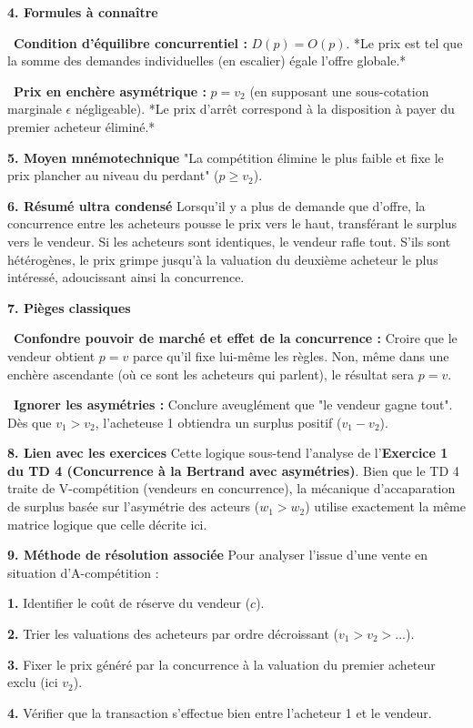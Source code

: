 \documentclass[11pt, a4paper]{report}
\begin{document}
\textbf{4. Formules à connaître}
\par \textbullet\ \textbf{Condition d'équilibre concurrentiel :} $D(p) = O(p)$. *Le prix est tel que la somme des demandes individuelles (en escalier) égale l'offre globale.*
\par \textbullet\ \textbf{Prix en enchère asymétrique :} $p = v_2$ (en supposant une sous-cotation marginale $\epsilon$ négligeable). *Le prix d'arrêt correspond à la disposition à payer du premier acheteur éliminé.*

\textbf{5. Moyen mnémotechnique}
"La compétition élimine le plus faible et fixe le prix plancher au niveau du perdant" ($p \ge v_2$).

\textbf{6. Résumé ultra condensé}
Lorsqu'il y a plus de demande que d'offre, la concurrence entre les acheteurs pousse le prix vers le haut, transférant le surplus vers le vendeur. Si les acheteurs sont identiques, le vendeur rafle tout. S'ils sont hétérogènes, le prix grimpe jusqu'à la valuation du deuxième acheteur le plus intéressé, adoucissant ainsi la concurrence.

\textbf{7. Pièges classiques}
\par \textbullet\ \textbf{Confondre pouvoir de marché et effet de la concurrence :} Croire que le vendeur obtient $p=v$ parce qu'il fixe lui-même les règles. Non, même dans une enchère ascendante (où ce sont les acheteurs qui parlent), le résultat sera $p=v$.
\par \textbullet\ \textbf{Ignorer les asymétries :} Conclure aveuglément que "le vendeur gagne tout". Dès que $v_1 > v_2$, l'acheteuse 1 obtiendra un surplus positif ($v_1 - v_2$).

\textbf{8. Lien avec les exercices}
Cette logique sous-tend l'analyse de l'\textbf{Exercice 1 du TD 4 (Concurrence à la Bertrand avec asymétries)}. Bien que le TD 4 traite de V-compétition (vendeurs en concurrence), la mécanique d'accaparation de surplus basée sur l'asymétrie des acteurs ($w_1 > w_2$) utilise exactement la même matrice logique que celle décrite ici. 

\textbf{9. Méthode de résolution associée}
Pour analyser l'issue d'une vente en situation d'A-compétition :
\par \textbf{1.} Identifier le coût de réserve du vendeur ($c$).
\par \textbf{2.} Trier les valuations des acheteurs par ordre décroissant ($v_1 > v_2 > ...$).
\par \textbf{3.} Fixer le prix généré par la concurrence à la valuation du premier acheteur exclu (ici $v_2$).
\par \textbf{4.} Vérifier que la transaction s'effectue bien entre l'acheteur 1 et le vendeur.
\end{document}
